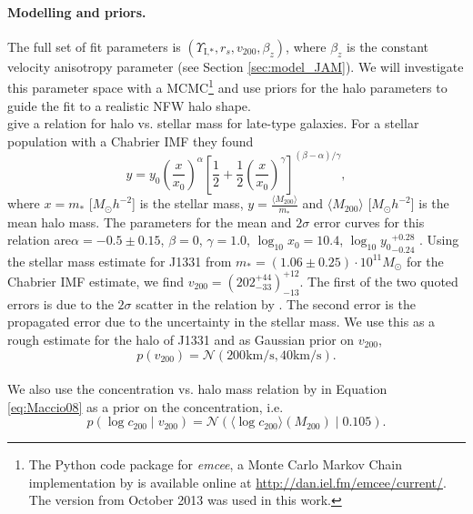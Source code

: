 \paragraph{Modelling and priors.} The full set of fit parameters is $(\Upsilon_\text{I,*},r_s,v_{200},\beta_z)$, where $\beta_z$ is the constant velocity anisotropy parameter (see Section \ref{sec:model_JAM}). We will investigate this parameter space with a MCMC\footnote{The Python code package for \emph{emcee}, a Monte Carlo Markov Chain implementation by \citet{emcee} is available online at \url{http://dan.iel.fm/emcee/current/}. The version from October 2013 was used in this work.} \citep{emcee} and use priors for the halo parameters to guide the fit to a realistic NFW halo shape.
\\\citet{Dutton10} give a relation for halo vs. stellar mass for late-type galaxies. For a stellar population with a Chabrier IMF they found
\begin{equation*}
y = y_0 \left( \frac{x}{x_0} \right)^\alpha \left[ \frac 12 + \frac 12 \left(\frac{x}{x_0} \right)^\gamma \right]^{(\beta - \alpha)/\gamma},
\end{equation*}
where $x= m_*$ [$M_\odot h^{-2}$] is the stellar mass, $y = \frac{\langle M_{200}\rangle}{m_*}$ and $\langle M_{200}\rangle$ [$M_\odot h^{-2}$] is the mean halo mass. The parameters for the mean and $2\sigma$ error curves for this relation are$\alpha = -0.5\pm0.15$, $\beta = 0$, $\gamma = 1.0$, $\log_{10} x_0 = 10.4$, $\log_{10} {y_0}_{-0.24}^{+0.28}$ \citet{Dutton10}. Using the stellar mass estimate for J1331 from \citet{SWELLSI} $m_* = (1.06 \pm 0.25) \cdot 10^{11} M_\odot$ for the Chabrier IMF estimate, we find ${v_{200}} = (202_{-33}^{+44})_{-13}^{+12}$. The first of the two quoted errors is due to the $2\sigma$ scatter in the relation by \citet{Dutton10}. The second error is the propagated error due to the uncertainty in the stellar mass. We use this as a rough estimate for the halo of J1331 and as Gaussian prior on $v_{200}$, 
\begin{equation*}
p(v_{200}) = \mathscr{N}(200 \text{km/s} ,40 \text{km/s}).
\end{equation*}
\\We also use the concentration vs. halo mass relation by \citet{Maccio08} in Equation \ref{eq:Maccio08} as a prior on the concentration, i.e.
\begin{equation*}
p(\log c_{200} \mid v_{200}) = \mathscr{N}\left(\langle \log c_{200} \rangle (M_{200}) \mid 0.105 \right).
\end{equation*}
